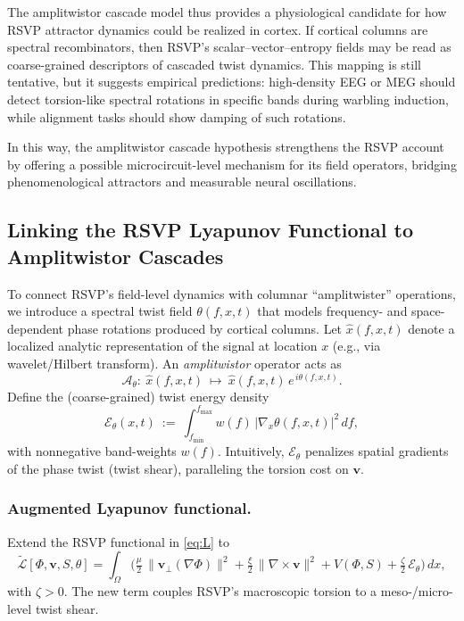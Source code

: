 \documentclass[a4paper,11pt]{article}
\begin{document}
The amplitwistor cascade model thus provides a physiological candidate for how
RSVP attractor dynamics could be realized in cortex. If cortical columns are
spectral recombinators, then RSVP’s scalar--vector--entropy fields may be read
as coarse-grained descriptors of cascaded twist dynamics. This mapping is still
tentative, but it suggests empirical predictions: high-density EEG or MEG
should detect torsion-like spectral rotations in specific bands during warbling
induction, while alignment tasks should show damping of such rotations.

In this way, the amplitwistor cascade hypothesis strengthens the RSVP account
by offering a possible microcircuit-level mechanism for its field operators,
bridging phenomenological attractors and measurable neural oscillations.

\subsection{Linking the RSVP Lyapunov Functional to Amplitwistor Cascades}
\label{sec:lyapunov-amplitwistor}

To connect RSVP’s field-level dynamics with columnar ``amplitwister'' operations,
we introduce a spectral twist field $\theta(f,x,t)$ that models frequency- and
space-dependent phase rotations produced by cortical columns. Let
$\widehat{x}(f,x,t)$ denote a localized analytic representation of the signal at
location $x$ (e.g., via wavelet/Hilbert transform). An \emph{amplitwistor}
operator acts as
\begin{equation}
\mathcal{A}_\theta:\ \widehat{x}(f,x,t)\ \mapsto\ \widehat{x}(f,x,t)\,e^{\,i\theta(f,x,t)}.
\end{equation}
Define the (coarse-grained) twist energy density
\begin{equation}
\mathcal{E}_\theta(x,t)\ :=\ \int_{f_{\min}}^{f_{\max}} w(f)\,\big|\nabla_x \theta(f,x,t)\big|^2\,df,
\end{equation}
with nonnegative band-weights $w(f)$. Intuitively, $\mathcal{E}_\theta$ penalizes
spatial gradients of the phase twist (twist shear), paralleling the torsion
cost on $\mathbf{v}$.

\subsubsection{Augmented Lyapunov functional.}
Extend the RSVP functional in \eqref{eq:L} to
\begin{equation}
\widetilde{\mathcal{L}}[\Phi,\mathbf{v},S,\theta]
=\int_\Omega \Big(
\tfrac{\mu}{2}\,\|\mathbf{v}_\perp(\nabla\Phi)\|^2
+\tfrac{\xi}{2}\,\|\nabla\times \mathbf{v}\|^2
+V(\Phi,S)
+\tfrac{\zeta}{2}\,\mathcal{E}_\theta
\Big)\,dx,
\end{equation}
with $\zeta>0$. The new term couples RSVP’s macroscopic torsion to a meso-/micro-
level twist shear.
\end{document}
